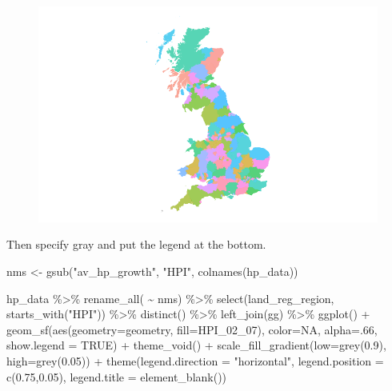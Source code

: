 \documentclass[
  letterpaper,
]{book}
\newenvironment{Shaded}{\begin{snugshade}}{\end{snugshade}}
\newcommand{\AttributeTok}[1]{\textcolor[rgb]{0.40,0.45,0.13}{#1}}
\newcommand{\ConstantTok}[1]{\textcolor[rgb]{0.56,0.35,0.01}{#1}}
\newcommand{\DecValTok}[1]{\textcolor[rgb]{0.68,0.00,0.00}{#1}}
\newcommand{\FloatTok}[1]{\textcolor[rgb]{0.68,0.00,0.00}{#1}}
\newcommand{\FunctionTok}[1]{\textcolor[rgb]{0.28,0.35,0.67}{#1}}
\newcommand{\NormalTok}[1]{\textcolor[rgb]{0.00,0.23,0.31}{#1}}
\newcommand{\OtherTok}[1]{\textcolor[rgb]{0.00,0.23,0.31}{#1}}
\newcommand{\SpecialCharTok}[1]{\textcolor[rgb]{0.37,0.37,0.37}{#1}}
\newcommand{\StringTok}[1]{\textcolor[rgb]{0.13,0.47,0.30}{#1}}
\begin{document}
\begin{figure}[H]

{\centering \includegraphics{Maps_files/figure-pdf/unnamed-chunk-4-1.pdf}

}

\end{figure}

Then specify gray and put the legend at the bottom.

\begin{Shaded}
\begin{Highlighting}[]
\NormalTok{nms }\OtherTok{\textless{}{-}} \FunctionTok{gsub}\NormalTok{(}\StringTok{"av\_hp\_growth"}\NormalTok{, }\StringTok{"HPI"}\NormalTok{, }\FunctionTok{colnames}\NormalTok{(hp\_data))}

\NormalTok{hp\_data }\SpecialCharTok{\%\textgreater{}\%}
  \FunctionTok{rename\_all}\NormalTok{( }\SpecialCharTok{\textasciitilde{}}\NormalTok{ nms) }\SpecialCharTok{\%\textgreater{}\%}
  \FunctionTok{select}\NormalTok{(land\_reg\_region, }\FunctionTok{starts\_with}\NormalTok{(}\StringTok{"HPI"}\NormalTok{)) }\SpecialCharTok{\%\textgreater{}\%}
  \FunctionTok{distinct}\NormalTok{() }\SpecialCharTok{\%\textgreater{}\%}
  \FunctionTok{left\_join}\NormalTok{(gg) }\SpecialCharTok{\%\textgreater{}\%}
  \FunctionTok{ggplot}\NormalTok{() }\SpecialCharTok{+}
  \FunctionTok{geom\_sf}\NormalTok{(}\FunctionTok{aes}\NormalTok{(}\AttributeTok{geometry=}\NormalTok{geometry, }\AttributeTok{fill=}\NormalTok{HPI\_02\_07), }
          \AttributeTok{color=}\ConstantTok{NA}\NormalTok{, }\AttributeTok{alpha=}\NormalTok{.}\DecValTok{66}\NormalTok{, }\AttributeTok{show.legend =} \ConstantTok{TRUE}\NormalTok{) }\SpecialCharTok{+}
  \FunctionTok{theme\_void}\NormalTok{() }\SpecialCharTok{+}
  \FunctionTok{scale\_fill\_gradient}\NormalTok{(}\AttributeTok{low=}\FunctionTok{grey}\NormalTok{(}\FloatTok{0.9}\NormalTok{), }\AttributeTok{high=}\FunctionTok{grey}\NormalTok{(}\FloatTok{0.05}\NormalTok{)) }\SpecialCharTok{+}
  \FunctionTok{theme}\NormalTok{(}\AttributeTok{legend.direction =} \StringTok{"horizontal"}\NormalTok{, }
        \AttributeTok{legend.position  =} \FunctionTok{c}\NormalTok{(}\FloatTok{0.75}\NormalTok{,}\FloatTok{0.05}\NormalTok{),}
        \AttributeTok{legend.title     =} \FunctionTok{element\_blank}\NormalTok{())}
\end{Highlighting}
\end{Shaded}
\end{document}
